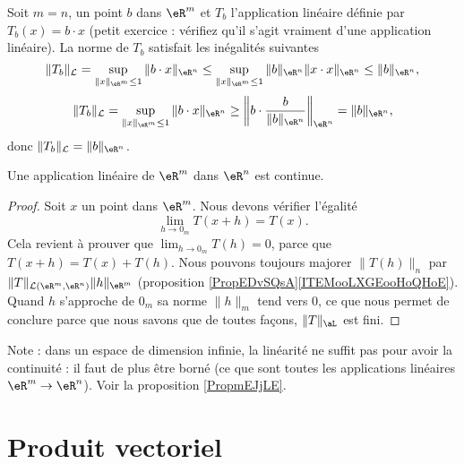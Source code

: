 
\begin{example}
  Soit $m=n$, un point $b$ dans $\eR^m$ et $T_b$ l'application linéaire définie par $T_b(x)=b\cdot x$ (petit exercice : vérifiez qu'il s'agit vraiment d'une application linéaire).  La norme de $T_b$ satisfait les inégalités suivantes 
 \[
\|T_b\|_{\mathcal{L}}=\sup_{\|x\|_{\eR^m}\leq 1}\|b\cdot x\|_{\eR^n}\leq \sup_{\|x\|_{\eR^m}\leq 1}\|b \|_{\eR^n}\|x\cdot x\|_{\eR^n}\leq\|b \|_{\eR^n},
\]
\[
\|T_b\|_{\mathcal{L}}=\sup_{\|x\|_{\eR^m}\leq 1}\|b\cdot x\|_{\eR^n}\geq \left\|b\cdot \frac{b}{\|b \|_{\eR^n}}\right\|_{\eR^n}=\|b \|_{\eR^n},
\]
donc $\|T_b\|_{\mathcal{L}}=\|b \|_{\eR^n}$.
\end{example}

\begin{proposition}
    Une application linéaire de \( \eR^m\) dans \( \eR^n\) est continue.
\end{proposition}

\begin{proof}
      Soit $x$ un point dans $\eR^m$. Nous devons vérifier l'égalité
      \begin{equation}
       \lim_{h\to 0_m}T(x+h)=T(x).
      \end{equation}
      Cela revient à prouver que $\lim_{h\to 0_m}T(h)=0$, parce que $T(x+h)=T(x)+T(h)$. Nous pouvons toujours majorer $\|T(h)\|_n$ par $\|T\|_{\mathcal{L}(\eR^m,\eR^n)}\| h \|_{\eR^m}$ (proposition \ref{PropEDvSQsA}\ref{ITEMooLXGEooHoQHoE}). Quand $h$ s'approche de $ 0_m $ sa norme $\|h\|_m$ tend vers $0$, ce que nous permet de conclure parce que nous savons que de toutes façons, $\| T \|_{\aL}$ est fini.
\end{proof}

Note : dans un espace de dimension infinie, la linéarité ne suffit pas pour avoir la continuité : il faut de plus être borné (ce que sont toutes les applications linéaires \( \eR^m\to\eR^n\)). Voir la proposition \ref{PropmEJjLE}.

\section{Produit vectoriel}
\label{SECooIKGNooSrlXTL}

